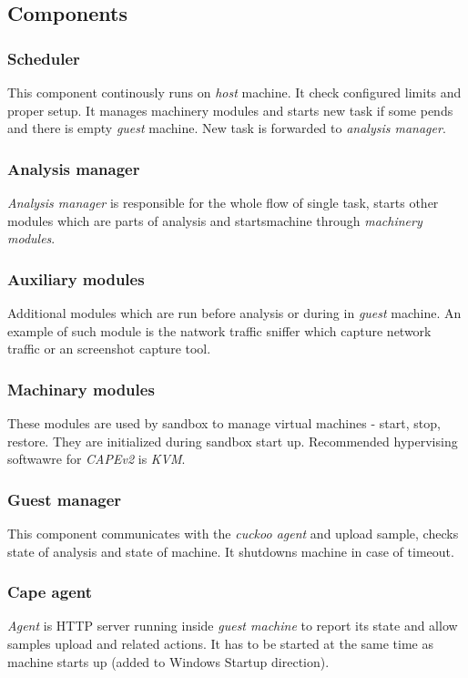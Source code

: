 
\subsection{Components}
\subsubsection*{Scheduler}
This component continously runs on \emph{host} machine. It check configured limits and proper setup. It manages machinery modules and starts new task if some pends and there is empty \emph{guest} machine. New task is forwarded to \emph{analysis manager}.

\subsubsection*{Analysis manager}
\emph{Analysis manager} is responsible for the whole flow of single task, starts other modules which are parts of analysis and starts\stops machine through \emph{machinery modules}.

\subsubsection*{Auxiliary modules}
Additional modules which are run before analysis or during in \emph{guest} machine. An example of such module is the natwork traffic sniffer which capture network traffic or an screenshot capture tool.

\subsubsection*{Machinary modules}
These modules are used by sandbox to manage virtual machines - start, stop, restore. They are initialized during sandbox start up. Recommended hypervising softwawre for \emph{CAPEv2} is \emph{KVM}.

\subsubsection*{Guest manager}
This component communicates with the \emph{cuckoo agent} and upload sample, checks state of analysis and state of machine. It shutdowns machine in case of timeout.

\subsubsection*{Cape agent}
\emph{Agent} is HTTP server running inside \emph{guest machine} to report its state and allow samples upload and related actions. It has to be started at the same time as machine starts up (added to Windows Startup direction).

